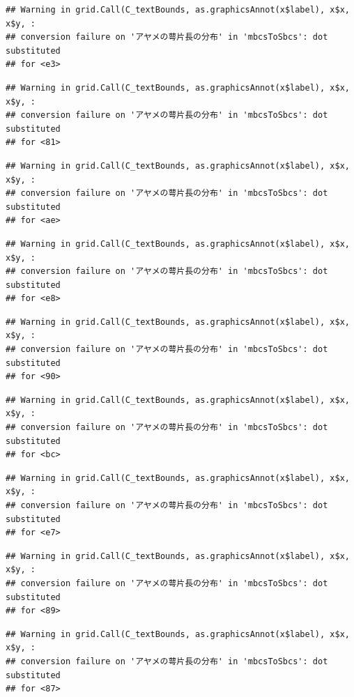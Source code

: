 \documentclass[
]{book}
\begin{document}
\begin{verbatim}
## Warning in grid.Call(C_textBounds, as.graphicsAnnot(x$label), x$x, x$y, :
## conversion failure on 'アヤメの萼片長の分布' in 'mbcsToSbcs': dot substituted
## for <e3>
\end{verbatim}

\begin{verbatim}
## Warning in grid.Call(C_textBounds, as.graphicsAnnot(x$label), x$x, x$y, :
## conversion failure on 'アヤメの萼片長の分布' in 'mbcsToSbcs': dot substituted
## for <81>
\end{verbatim}

\begin{verbatim}
## Warning in grid.Call(C_textBounds, as.graphicsAnnot(x$label), x$x, x$y, :
## conversion failure on 'アヤメの萼片長の分布' in 'mbcsToSbcs': dot substituted
## for <ae>
\end{verbatim}

\begin{verbatim}
## Warning in grid.Call(C_textBounds, as.graphicsAnnot(x$label), x$x, x$y, :
## conversion failure on 'アヤメの萼片長の分布' in 'mbcsToSbcs': dot substituted
## for <e8>
\end{verbatim}

\begin{verbatim}
## Warning in grid.Call(C_textBounds, as.graphicsAnnot(x$label), x$x, x$y, :
## conversion failure on 'アヤメの萼片長の分布' in 'mbcsToSbcs': dot substituted
## for <90>
\end{verbatim}

\begin{verbatim}
## Warning in grid.Call(C_textBounds, as.graphicsAnnot(x$label), x$x, x$y, :
## conversion failure on 'アヤメの萼片長の分布' in 'mbcsToSbcs': dot substituted
## for <bc>
\end{verbatim}

\begin{verbatim}
## Warning in grid.Call(C_textBounds, as.graphicsAnnot(x$label), x$x, x$y, :
## conversion failure on 'アヤメの萼片長の分布' in 'mbcsToSbcs': dot substituted
## for <e7>
\end{verbatim}

\begin{verbatim}
## Warning in grid.Call(C_textBounds, as.graphicsAnnot(x$label), x$x, x$y, :
## conversion failure on 'アヤメの萼片長の分布' in 'mbcsToSbcs': dot substituted
## for <89>
\end{verbatim}

\begin{verbatim}
## Warning in grid.Call(C_textBounds, as.graphicsAnnot(x$label), x$x, x$y, :
## conversion failure on 'アヤメの萼片長の分布' in 'mbcsToSbcs': dot substituted
## for <87>
\end{verbatim}
\end{document}
